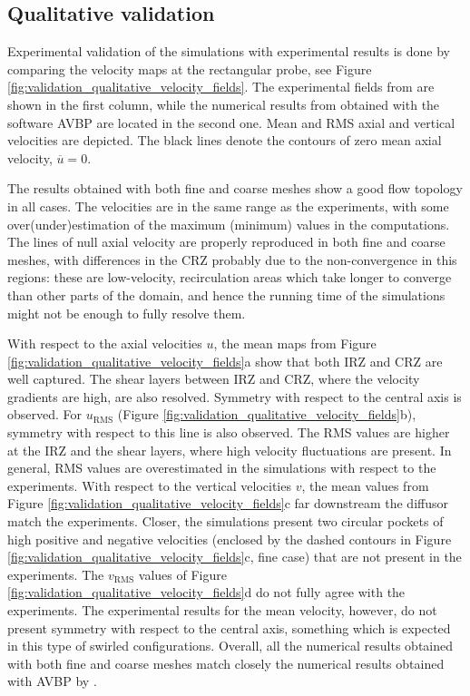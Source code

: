 
\vspace{-0.1in}
\subsection{Qualitative validation}

Experimental validation of the simulations with experimental results is done by comparing the velocity maps at the rectangular probe, see Figure \ref{fig:validation_qualitative_velocity_fields}. The experimental fields from  are shown in the first column, while the numerical results from  obtained with the software AVBP are located in the second one. Mean and RMS axial and vertical velocities are depicted. The black lines denote the contours of zero mean axial velocity, $\overline{u} = 0$.

The results obtained with both fine and coarse meshes show a good flow topology in all cases. The velocities are in the same range as the experiments, with some over(under)estimation of the maximum (minimum) values in the computations. The lines of null axial velocity are properly reproduced in both fine and coarse meshes, with differences in the CRZ probably due to the non-convergence in this regions: these are low-velocity, recirculation areas which take longer to converge than other parts of the domain, and hence the running time of the simulations might not be enough to fully resolve them. 

With respect to the axial velocities $u$, the mean maps from Figure \ref{fig:validation_qualitative_velocity_fields}a show that both IRZ and CRZ are well captured. The shear layers between IRZ and CRZ, where the velocity gradients are high, are also resolved. Symmetry with respect to the central axis is observed. For $u_\mathrm{RMS}$ (Figure \ref{fig:validation_qualitative_velocity_fields}b), symmetry with respect to this line is also observed. The RMS values are higher at the IRZ and the shear layers, where high velocity fluctuations are present. In general, RMS values are overestimated in the simulations with respect to the experiments. With respect to the vertical velocities $v$, the mean values from Figure \ref{fig:validation_qualitative_velocity_fields}c far downstream the diffusor match the experiments. Closer, the simulations present two circular pockets of high positive and negative velocities (enclosed by the dashed contours in Figure \ref{fig:validation_qualitative_velocity_fields}c, fine case) that are not present in the experiments. The $v_\mathrm{RMS}$ values of Figure \ref{fig:validation_qualitative_velocity_fields}d do not fully agree with the experiments. The experimental results for the mean velocity, however, do not present symmetry with respect to the central axis, something which is expected in this type of swirled configurations. Overall, all the numerical results obtained with both fine and coarse meshes match closely the numerical results obtained with AVBP by .


